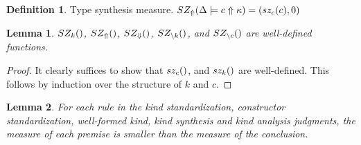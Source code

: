 \documentclass[12pt,twoside,fleqn]{amsart}
\theoremstyle{plain}
\theoremstyle{plain}
\newtheorem{lem}{Lemma}
\theoremstyle{definition}
\newtheorem{defn}{Definition}
\begin{document}
\begin{defn}
Type synthesis measure. \( SZ_{\Uparrow }(\Delta   \models c  \Uparrow \kappa   )=(sz_{c}(c ),0) \)
\end{defn}
\begin{lem}
\( SZ_k() \), \( SZ_{\Uparrow }( ) \), \( SZ_{\Downarrow }( ) \), \( SZ_{\backslash k}( ) \), and \( SZ_{\backslash c}( ) \)
are well-defined functions.
\end{lem}
\begin{proof}
It clearly suffices to show that \( sz_{c}( ) \), and \( sz_k() \) are well-defined.
This follows by induction over the structure of \( k \) and \( c \).
\end{proof}
\begin{lem}
\label{lem:ExtConKindMeasureReduce}For each rule in the kind standardization,
constructor standardization, well-formed kind, kind synthesis and kind analysis
judgments, the measure of each premise is smaller than the measure of the conclusion. 
\end{lem}
\end{document}
